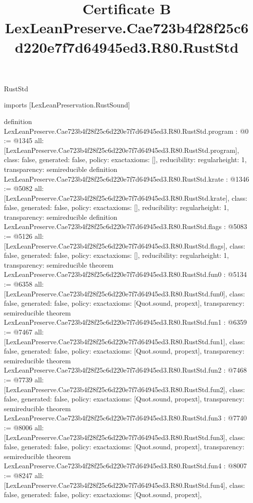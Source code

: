 \begin{lexlean}{RustStd}
\title{Certificate B LexLeanPreserve.Cae723b4f28f25c6d220e7f7d64945ed3.R80.RustStd}
\begin{coremodule}
imports [LexLeanPreservation.RustSound]

definition LexLeanPreserve.Cae723b4f28f25c6d220e7f7d64945ed3.R80.RustStd.program : @0 := @1345 {
  all: [LexLeanPreserve.Cae723b4f28f25c6d220e7f7d64945ed3.R80.RustStd.program],
  class: false,
  generated: false,
  policy: exact{axioms: []},
  reducibility: regular{height: 1},
  transparency: semireducible
}
definition LexLeanPreserve.Cae723b4f28f25c6d220e7f7d64945ed3.R80.RustStd.krate : @1346 := @5082 {
  all: [LexLeanPreserve.Cae723b4f28f25c6d220e7f7d64945ed3.R80.RustStd.krate],
  class: false,
  generated: false,
  policy: exact{axioms: []},
  reducibility: regular{height: 1},
  transparency: semireducible
}
definition LexLeanPreserve.Cae723b4f28f25c6d220e7f7d64945ed3.R80.RustStd.flags : @5083 := @5126 {
  all: [LexLeanPreserve.Cae723b4f28f25c6d220e7f7d64945ed3.R80.RustStd.flags],
  class: false,
  generated: false,
  policy: exact{axioms: []},
  reducibility: regular{height: 1},
  transparency: semireducible
}
theorem LexLeanPreserve.Cae723b4f28f25c6d220e7f7d64945ed3.R80.RustStd.fun0 : @5134 := @6358 {
  all: [LexLeanPreserve.Cae723b4f28f25c6d220e7f7d64945ed3.R80.RustStd.fun0],
  class: false,
  generated: false,
  policy: exact{axioms: [Quot.sound, propext]},
  transparency: semireducible
}
theorem LexLeanPreserve.Cae723b4f28f25c6d220e7f7d64945ed3.R80.RustStd.fun1 : @6359 := @7467 {
  all: [LexLeanPreserve.Cae723b4f28f25c6d220e7f7d64945ed3.R80.RustStd.fun1],
  class: false,
  generated: false,
  policy: exact{axioms: [Quot.sound, propext]},
  transparency: semireducible
}
theorem LexLeanPreserve.Cae723b4f28f25c6d220e7f7d64945ed3.R80.RustStd.fun2 : @7468 := @7739 {
  all: [LexLeanPreserve.Cae723b4f28f25c6d220e7f7d64945ed3.R80.RustStd.fun2],
  class: false,
  generated: false,
  policy: exact{axioms: [Quot.sound, propext]},
  transparency: semireducible
}
theorem LexLeanPreserve.Cae723b4f28f25c6d220e7f7d64945ed3.R80.RustStd.fun3 : @7740 := @8006 {
  all: [LexLeanPreserve.Cae723b4f28f25c6d220e7f7d64945ed3.R80.RustStd.fun3],
  class: false,
  generated: false,
  policy: exact{axioms: [Quot.sound, propext]},
  transparency: semireducible
}
theorem LexLeanPreserve.Cae723b4f28f25c6d220e7f7d64945ed3.R80.RustStd.fun4 : @8007 := @8247 {
  all: [LexLeanPreserve.Cae723b4f28f25c6d220e7f7d64945ed3.R80.RustStd.fun4],
  class: false,
  generated: false,
  policy: exact{axioms: [Quot.sound, propext]},
}
\end{coremodule}
\end{lexlean}
